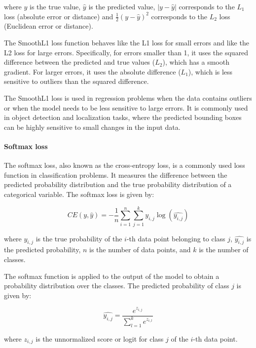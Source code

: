 where $y$ is the true value, $\hat{y}$ is the predicted value, $|y - \hat{y}|$ corresponds to the $L_1$ loss (absolute error or distance) and $\frac{1}{2}(y - \hat{y})^2$ corresponds to the $L_2$ loss (Euclidean error or distance).

The SmoothL1 loss function behaves like the L1 loss for small errors and like the L2 loss for large errors. Specifically, for errors smaller than 1, it uses the squared difference between the predicted and true values ($L_2$), which has a smooth gradient. For larger errors, it uses the absolute difference ($L_1$), which is less sensitive to outliers than the squared difference.

The SmoothL1 loss is used in regression problems when the data contains outliers or when the model needs to be less sensitive to large errors. It is commonly used in object detection and localization tasks, where the predicted bounding boxes can be highly sensitive to small changes in the input data.

\paragraph{Softmax loss}
\label{par:3_softmax_loss}

The softmax loss, also known as the cross-entropy loss, is a commonly used loss function in classification problems. It measures the difference between the predicted probability distribution and the true probability distribution of a categorical variable. The softmax loss is given by:

\begin{equation}
	CE(y, \hat{y}) = -\frac{1}{n}\sum_{i=1}^{n}\sum_{j=1}^{k} y_{i,j}\log(\hat{y_{i,j}})
\end{equation}

where $y_{i,j}$ is the true probability of the $i$-th data point belonging to class $j$, $\hat{y_{i,j}}$ is the predicted probability, $n$ is the number of data points, and $k$ is the number of classes.

The softmax function is applied to the output of the model to obtain a probability distribution over the classes. The predicted probability of class $j$ is given by:

\begin{equation}
	\hat{y_{i,j}} = \frac{e^{z_{i,j}}}{\sum_{l=1}^{k} e^{z_{i,l}}}
\end{equation}

where $z_{i,j}$ is the unnormalized score or logit for class $j$ of the $i$-th data point.


